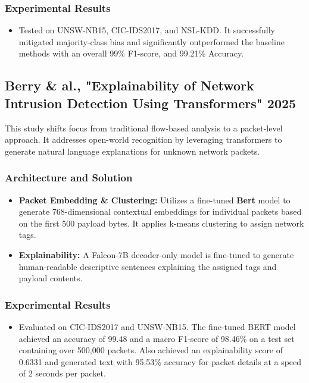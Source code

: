 \documentclass[12pt, a4paper]{report}
\begin{document}
\subsubsection{Experimental Results}
\begin{itemize}
    \item Tested on UNSW-NB15, CIC-IDS2017, and NSL-KDD. It successfully mitigated majority-class bias and significantly outperformed the baseline methods with an overall 99\% F1-score, and 99.21\% Accuracy.
\end{itemize}

\subsection{Berry \& al., "Explainability of Network Intrusion Detection Using Transformers" 2025}
This study \cite{rajkumardheivanayahi2025explainability} shifts focus from traditional flow-based analysis to a packet-level approach. It addresses open-world recognition by leveraging transformers to generate natural language explanations for unknown network packets.

\subsubsection{Architecture and Solution}

\begin{itemize}
    \item \textbf{Packet Embedding \& Clustering:} Utilizes a fine-tuned \textbf{Bert} model to generate 768-dimensional contextual embeddings for individual packets based on the first 500 payload bytes. It applies k-means clustering to assign network tags.
    \item \textbf{Explainability:} A Falcon-7B decoder-only model is fine-tuned to generate human-readable descriptive sentences explaining the assigned tags and payload contents.
\end{itemize}

\subsubsection{Experimental Results}
\begin{itemize}
    \item Evaluated on CIC-IDS2017 and UNSW-NB15. 
    The fine-tuned BERT model achieved an accuracy of 99.48 and a macro F1-score of 98.46\% on a test set containing over 500,000 packets.
    Also achieved an explainability score of 0.6331 and generated text with 95.53\% accuracy for packet details at a speed of 2 seconds per packet.
\end{itemize}
\end{document}

